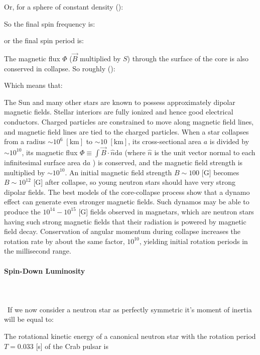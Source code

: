 	Or,  for a sphere of constant density  ():
	
	So the final spin frequency is:
	
	or the final spin period is:
	
	The magnetic flux $\Phi$ ($\vec{B}$ multiplied by $S$) through the surface of the core is also conserved in collapse. So roughly ():
	
	Which means that:
	
	The Sun and many other stars are known to possess approximately dipolar magnetic fields. Stellar interiors are fully ionized and hence good electrical conductors. Charged particles are constrained to move along magnetic field lines, and magnetic field lines are tied to the charged particles. When a star collapses from a radius $\sim 10^{6}\; [\text{km}]$ to $\sim 10\; [\text{km}]$, its cross-sectional area $a$ is divided by $\sim 10^{10}$, its magnetic flux $\Phi \equiv \int \vec{B} \cdot \hat{n} \mathrm{d}a$ (where $\hat{n}$ is the unit vector normal to each infinitesimal surface area $\mathrm{d}a$ ) is conserved, and the magnetic field strength is multiplied by $\sim 10^{10}$. An initial magnetic field strength $B \sim 100$ [G] becomes $B \sim 10^{12}$ [G] after collapse, so young neutron stars should have very strong dipolar fields. The best models of the core-collapse process show that a dynamo effect can generate even stronger magnetic fields. Such dynamos may be able to produce the $10^{14}-10^{15}$ [G] fields observed in magnetars, which are neutron stars having such strong magnetic fields that their radiation is powered by magnetic field decay. Conservation of angular momentum during collapse increases the rotation rate by about the same factor, $10^{10}$, yielding initial rotation periods in the millisecond range.
	
	\paragraph{Spin-Down Luminosity}\mbox{}\\\\\
	If we now consider a neutron star as perfectly symmetric it's moment of inertia will be equal to:
	
	The rotational kinetic energy of a canonical neutron star with the rotation period $T=0.033$ [s] of the Crab pulsar is
	
